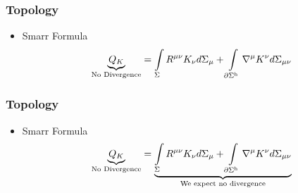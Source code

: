 \documentclass[t]{beamer}
\begin{document}
\begin{frame}
\frametitle{Topology}
\begin{itemize}
\setlength{\parskip}{10pt}
\item Smarr Formula
\begin{align}
\underbrace{Q_{K}}_{\text{No Divergence}} =\int\limits_{\Sigma} R^{\mu\nu} K_\nu d\Sigma_{\mu} + \int\limits_{\partial \Sigma^{\text{h}}} \nabla^{\mu} K^{\nu} d\Sigma_{\mu\nu} \notag
\end{align}
\end{itemize}
\end{frame}


\begin{frame}
\frametitle{Topology}
\begin{itemize}
\setlength{\parskip}{10pt}
\item Smarr Formula
\begin{align}
\underbrace{Q_{K}}_{\text{No Divergence}} = \underbrace{\int\limits_{\Sigma} R^{\mu\nu} K_\nu d\Sigma_{\mu} + \int\limits_{\partial \Sigma^{\text{h}}} \nabla^{\mu} K^{\nu} d\Sigma_{\mu\nu}}_{\text{We expect no divergence}} \notag
\end{align}
\end{itemize}

\end{frame}
\end{document}
